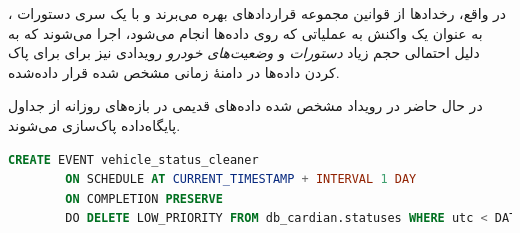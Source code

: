 در واقع، رخدادها از قوانین مجموعه قراردادهای  بهره می‌برند و با یک سری دستورات ، به عنوان یک واکنش به عملیاتی که روی داده‌ها انجام می‌شود، اجرا می‌شوند که به دلیل احتمالی حجم زیاد \textit{دستورات} و \textit{وضعیت‌های خودرو} رویدادی نیز برای برای پاک کردن داده‌ها در دامنهٔ زمانی مشخص شده قرار داده‌شده.

در حال حاضر در رویداد مشخص شده داده‌های قدیمی در بازه‌های روزانه از جداول پایگاه‌داده پاک‌سازی می‌شوند.

\begin{latin}
	\small
	\begin{lstlisting}[language=sql,caption={automated remove vehicle's status event}]
		CREATE EVENT vehicle_status_cleaner
		ON SCHEDULE AT CURRENT_TIMESTAMP + INTERVAL 1 DAY
		ON COMPLETION PRESERVE
		DO DELETE LOW_PRIORITY FROM db_cardian.statuses WHERE utc < DATE_SUB(NOW(), INTERVAL 1 DAY)
	\end{lstlisting}
\end{latin}